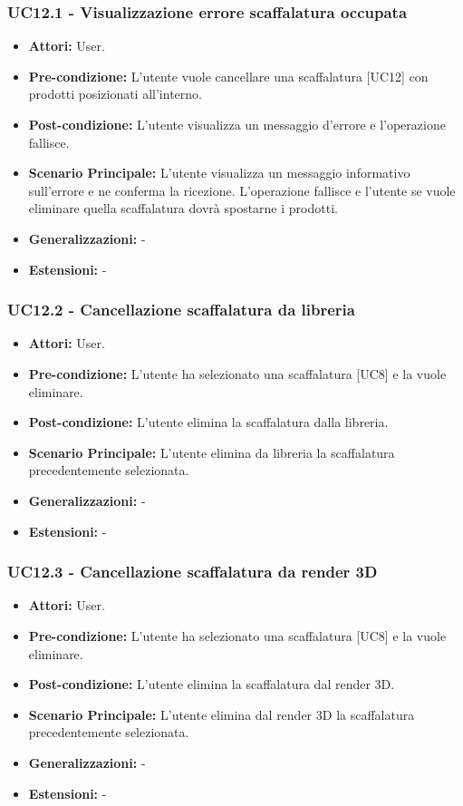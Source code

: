 \subsubsection{UC12.1 - Visualizzazione errore scaffalatura occupata}
\begin{itemize}
    \item \textbf{Attori:} User.
    \item \textbf{Pre-condizione:} L'utente vuole cancellare una scaffalatura [UC12] con prodotti posizionati all'interno.
    \item \textbf{Post-condizione:} L'utente visualizza un messaggio d'errore e l'operazione fallisce.
    \item \textbf{Scenario Principale:} L'utente visualizza un messaggio informativo sull'errore e ne conferma la ricezione. L'operazione fallisce e l'utente se vuole eliminare quella scaffalatura dovrà spostarne i prodotti.   
    \item \textbf{Generalizzazioni:} -
    \item \textbf{Estensioni:} -
\end{itemize}


\subsubsection{UC12.2 - Cancellazione scaffalatura da libreria}
\begin{itemize}
    \item \textbf{Attori:} User.
    \item \textbf{Pre-condizione:} L'utente ha selezionato una scaffalatura [UC8] e la vuole eliminare.
    \item \textbf{Post-condizione:} L'utente elimina la scaffalatura dalla libreria.
    \item \textbf{Scenario Principale:} L'utente elimina da libreria la scaffalatura precedentemente selezionata.   
    \item \textbf{Generalizzazioni:} -
    \item \textbf{Estensioni:} -
\end{itemize}


\subsubsection{UC12.3 - Cancellazione scaffalatura da render 3D}
\begin{itemize}
    \item \textbf{Attori:} User.
    \item \textbf{Pre-condizione:} L'utente ha selezionato una scaffalatura [UC8] e la vuole eliminare.
    \item \textbf{Post-condizione:} L'utente elimina la scaffalatura dal render 3D.
    \item \textbf{Scenario Principale:} L'utente elimina dal render 3D la scaffalatura precedentemente selezionata.   
    \item \textbf{Generalizzazioni:} -
    \item \textbf{Estensioni:} -
\end{itemize}